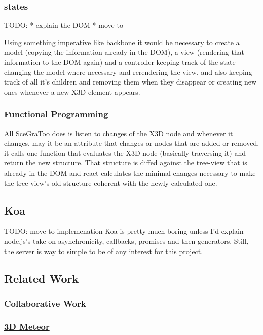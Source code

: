\subsubsection{states}\label{states}

TODO: * explain the DOM * move to

Using something imperative like backbone it would be necessary to create
a model (copying the information already in the DOM), a view (rendering
that information to the DOM again) and a controller keeping track of the
state changing the model where necessary and rerendering the view, and
also keeping track of all it's children and removing them when they
disappear or creating new ones whenever a new X3D element appears.

\subsubsection{Functional Programming}\label{functional-programming}

All SceGraToo does is listen to changes of the X3D node and whenever it
changes, may it be an attribute that changes or nodes that are added or
removed, it calls one function that evaluates the X3D node (basically
traversing it) and return the new structure. That structure is diffed
against the tree-view that is already in the DOM and react calculates
the minimal changes necessary to make the tree-view's old structure
coherent with the newly calculated one.

\subsection{Koa}\label{koa}

TODO: move to implemenation Koa is pretty much boring unless I'd explain
node.js's take on asynchronicity, callbacks, promises and then
generators. Still, the server is way to simple to be of any interest for
this project.

\subsection{Related Work}\label{related-work}

\subsubsection{Collaborative Work}\label{collaborative-work}

\subsubsection{\texorpdfstring{\href{http://3d.meteor.com/}{3D
Meteor}}{3D Meteor}}\label{d-meteor0}

